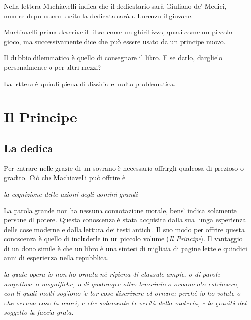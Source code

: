 \documentclass[a4paper]{article}
\begin{document}
Nella lettera Machiavelli indica che il dedicatario sarà Giuliano de' Medici,
mentre dopo essere uscito la dedicata sarà a Lorenzo il giovane. %

Machiavelli prima descrive il libro come un ghiribizzo, quasi come un piccolo gioco,
ma successivamente dice che può essere usato da un principe nuovo.

Il dubbio dilemmatico è quello di consegnare il libro.
E se darlo, darglielo personalmente o per altri mezzi?

La lettera è quindi piena di dissirio e molto problematica.

\section{Il Principe}

\subsection{La dedica}

Per entrare nelle grazie di un sovrano è necessario offrirgli qualcosa di prezioso o gradito.
Ciò che Machiavelli può offrire è
\begin{center}
    \textit{la cognizione delle azioni degli uomini grandi}
\end{center}
La parola grande non ha nessuna connotazione morale, bensì indica solamente
persone di potere.
Questa conoscenza è stata acquisita dalla sua lunga esperienza delle cose moderne
e dalla lettura dei testi antichi.
Il suo modo per offrire questa conoscenza è quello di includerle in un piccolo volume (\textit{Il Principe}).
Il vantaggio di un dono simile è che un libro è una sintesi di migliaia di pagine
lette e quindici anni di esperienza nella repubblica.


\begin{center}
    \textit{
        la quale opera io non ho ornata nè ripiena di clausule ampie, o di parole ampollose o magnifiche, o di qualunque altro lenocinio o ornamento estrinseco, con li quali molti sogliono le lor cose discrivere ed ornare; perchè io ho voluto o che veruna cosa la onori, o che solamente la verità della materia, e la gravità del soggetto la faccia grata.
    }
\end{center}
\end{document}
